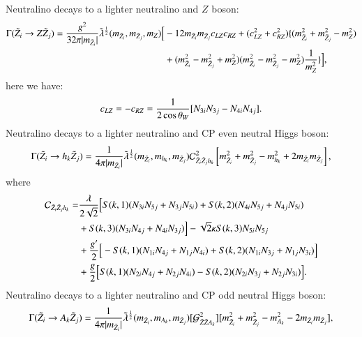 \documentclass[final,3p,times]{elsarticle}
\begin{document}
Neutralino decays to a lighter neutralino and $Z$ boson:
\begin{equation} \label{neutZneutNMSSM}
\begin{aligned}
\Gamma(\tilde{Z}_i \rightarrow Z \tilde{Z}_j) = {g^2 \over 32 \pi |m_{\tilde{Z}_i}|} \tilde{\lambda}^{1 \over 2}(m_{\tilde{Z}_i},m_{\tilde{Z}_j},m_{Z})\Big[ & -12m_{\tilde{Z}_i} m_{\tilde{Z}_j} c_{LZ}c_{RZ} + (c_{LZ}^2 + c_{RZ}^2)\{(m_{\tilde{Z}_i}^2 + m_{\tilde{Z}_j}^2 - m_{Z}^2) \\ & + (m_{\tilde{Z}_i}^2 - m_{\tilde{Z}_j}^2 + m_{Z}^2)(m_{\tilde{Z}_i}^2 - m_{\tilde{Z}_j}^2 - m_{Z}^2){1 \over m_{Z}^2}\}\Big],
\end{aligned}
\end{equation}
here we have:
\begin{equation}
c_{LZ} = -c_{RZ} = {1 \over 2 \cos\theta_W} [N_{3i}N_{3j} - N_{4i}N_{4j}].
\end{equation}
Neutralino decays to a lighter neutralino and CP even neutral Higgs boson:
\begin{equation} \label{neuthneutNMSSM}
\Gamma(\tilde{Z}_i \rightarrow h_{k} \tilde{Z}_j) = {1 \over 4 \pi |m_{\tilde{Z}_i}|} \tilde{\lambda}^{1 \over 2}(m_{\tilde{Z}_i},m_{h_k}, m_{\tilde{Z}_j}) \mathcal{C}_{\tilde{Z}_i \tilde{Z}_j h_{k}}^2\left[m_{\tilde{Z}_i}^2 + m_{\tilde{Z}_j}^2 - m_{h_k}^2 + 2m_{\tilde{Z}_i}m_{\tilde{Z}_j}\right],
\end{equation}
where
\begin{equation} \label{neutneuthNMSSM}
\begin{aligned}
\mathcal{C}_{\tilde{Z}_i \tilde{Z}_j h_{k}} = & {\lambda \over 2 \sqrt{2}}\Big[S(k,1)(N_{3i}N_{5j} + N_{3j}N_{5i}) + S(k,2)(N_{4i}N_{5j} + N_{4j}N_{5i}) \\ &  + S(k,3)(N_{3i}N_{4j} + N_{4i}N_{3j})\Big] - \sqrt{2} \kappa S(k,3) N_{5i}N_{5j} \\ &  + {g' \over 2}\Big[-S(k,1)(N_{1i}N_{4j} + N_{1j}N_{4i}) + S(k,2)(N_{1i}N_{3j} + N_{1j}N_{3i})\Big] \\ &  + {g \over 2}\Big[S(k,1)(N_{2i}N_{4j} + N_{2j}N_{4i}) - S(k,2)(N_{2i}N_{3j} + N_{2j}N_{3i})\Big].
\end{aligned}
\end{equation}
Neutralino decays to a lighter neutralino and CP odd neutral Higgs boson:
\begin{equation} \label{neutAneutNMSSM}
\Gamma(\tilde{Z}_i \rightarrow A_{k} \tilde{Z}_j) = {1 \over 4 \pi |m_{\tilde{Z}_i}|} \tilde{\lambda}^{1 \over 2}(m_{\tilde{Z}_i},m_{A_k}, m_{\tilde{Z}_j})[\mathcal{G}_{\tilde{Z} \tilde{Z} A_k}^2][m_{\tilde{Z}_i}^2 + m_{\tilde{Z}_j}^2 - m_{A_k}^2 - 2m_{\tilde{Z}_i}m_{\tilde{Z}_j}],
\end{equation}
\end{document}
